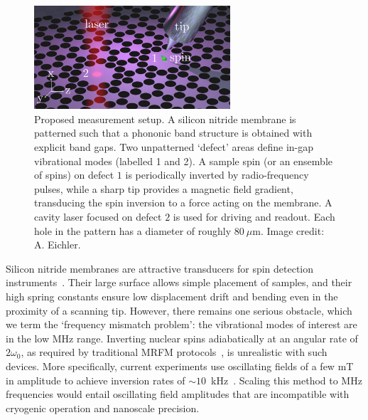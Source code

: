 \begin{figure}
	\centering
	\includegraphics[width=0.65\textwidth]{figures/spins/fig1.pdf} %
	\caption{\label{fig:spins_fig1} Proposed measurement setup. A silicon nitride membrane is patterned such that a phononic band structure is obtained with explicit band gaps. Two unpatterned `defect' areas define in-gap vibrational modes (labelled 1 and 2). A sample spin (or an ensemble of spins) on defect $1$ is periodically inverted by radio-frequency pulses, while a sharp tip provides a magnetic field gradient, transducing the spin inversion to a force acting on the membrane. A cavity laser focused on defect $2$ is used for driving and readout. Each hole in the pattern has a diameter of roughly $80~\mu$m. Image credit: A. Eichler.}
\end{figure}

Silicon nitride membranes are attractive transducers for spin detection instruments~\cite{Scozzaro_2016, Blankenhorn_2017, Takahashi_2018, Fischer_2019}. Their large surface allows simple placement of samples, and their high spring constants ensure low displacement drift and bending even in the proximity of a scanning tip. However, there remains one serious obstacle, which we term the `frequency mismatch problem': the vibrational modes of interest are in the low MHz range. Inverting nuclear spins adiabatically at an angular rate of $2\omega_0$, as required by traditional MRFM protocols~\cite{Sidles_1991, Degen_2009}, is unrealistic with such devices. More specifically, current experiments use oscillating fields of a few mT in amplitude to achieve inversion rates of $\sim 10$~kHz~\cite{Grob_2019}. Scaling this method to MHz frequencies would entail oscillating field amplitudes that are incompatible with cryogenic operation and nanoscale precision.

